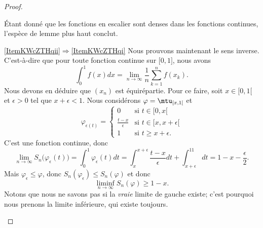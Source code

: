 \begin{proof}
\begin{subproof}
		Étant donné que les fonctions en escalier sont denses dans les fonctions continues, l'espèce de lemme plus haut conclut.

		\item[\ref{ItemKWcZTHqii}\( \Rightarrow\)\ref{ItemKWcZTHqi}]
		Nous prouvons maintenant le sens inverse. C'est-à-dire que pour toute fonction continue sur \( \mathopen[ 0 , 1 \mathclose]\), nous avons
		\begin{equation}
			\int_0^1f(x)dx=\lim_{n\to \infty} \frac{1}{ n }\sum_{k=1}^nf(x_k).
		\end{equation}
		Nous devons en déduire que \( (x_n)\) est équirépartie. Pour ce faire, soit \( x\in \mathopen[ 0 , 1 [\) et \( \epsilon>0\) tel que \( x+\epsilon<1\). Nous considérons \( \varphi=\mtu_{\mathopen[ x , 1 [}\) et
		\begin{equation}
			\varphi_{\epsilon(t)}=\begin{cases}
				0                        & \text{si } t\in\mathopen[ 0 , x [           \\
				\frac{ t-x }{ \epsilon } & \text{si } t\in \mathopen[ x , x+\epsilon [ \\
				1                        & \text{si } t\geq x+\epsilon.
			\end{cases}
		\end{equation}
		C'est une fonction continue, donc
		\begin{equation}
			\lim_{n\to \infty} S_n\big( \varphi_{\epsilon}(t) \big)=\int_0^1\varphi_{\epsilon}(t)dt=\int_{x}^{x+\epsilon}\frac{ t-x }{ \epsilon }dt+\int_{x+\epsilon}^11dt=1-x-\frac{ \epsilon }{2}.
		\end{equation}
		Mais \( \varphi_{\epsilon}\leq \varphi\), donc \( S_n(\varphi_{\epsilon})\leq S_n(\varphi)\) et donc
		\begin{equation}
			\liminf_{n\to \infty}S_n(\varphi)\geq 1-x.
		\end{equation}
		Notons que nous ne savons pas si la \emph{vraie} limite de gauche existe; c'est pourquoi nous prenons la limite inférieure, qui existe toujours.


\end{subproof}
\end{proof}
